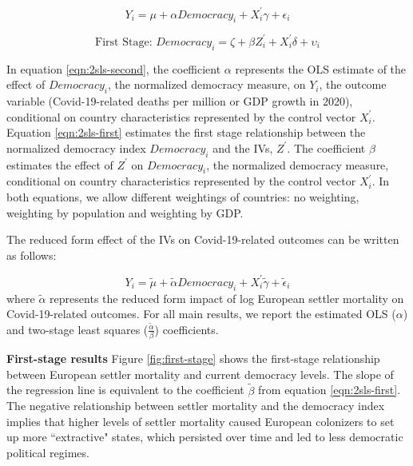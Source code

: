 \begin{equation}
    \label{eqn:2sls-second}
    Y_i = \mu + \alpha Democracy_i + X^{'}_i \gamma + \epsilon_i
\end{equation}

\begin{equation}
    \label{eqn:2sls-first}
    \text{First Stage: } 
    Democracy_i = \zeta + \beta Z^{'}_i + X^{'}_i \delta + \upsilon_i
\end{equation}

\noindent In equation \ref{eqn:2sls-second}, the coefficient $\alpha$ represents the OLS estimate of the effect of $Democracy_i$, the normalized democracy measure, on $Y_i$, the outcome variable (Covid-19-related deaths per million or GDP growth in 2020), conditional on country characteristics represented by the control vector $X^{'}_i$. Equation \ref{eqn:2sls-first} estimates the first stage relationship between the normalized democracy index $Democracy_i$ and the IVs, $Z^{'}$. The coefficient $\beta$ estimates the effect of $Z^{'}$ on $Democracy_i$, the normalized democracy measure, conditional on country characteristics represented by the control vector $X^{'}_i$. In both equations, we allow different weightings of countries: no weighting, weighting by population and weighting by GDP.

The reduced form effect of the IVs on Covid-19-related outcomes can be written as follows:

\begin{equation}
    \label{eqn:reduced}
    Y_i = \tilde{\mu} + \tilde{\alpha}Democracy_i + X^{'}_i\tilde{\gamma} + \tilde{\epsilon}_i
\end{equation}
where $\tilde{\alpha}$ represents the reduced form impact of log European settler mortality on Covid-19-related outcomes. For all main results, we report the estimated OLS ($\alpha$) and two-stage least squares ($\frac{\tilde{\alpha}}{\beta}$) coefficients. 

\noindent \textbf{First-stage results} Figure \ref{fig:first-stage} shows the first-stage relationship between European settler mortality and current democracy levels. The slope of the regression line is equivalent to the coefficient $\tilde{\beta}$ from equation \ref{eqn:2sls-first}. The negative relationship between settler mortality and the democracy index implies that higher levels of settler mortality caused European colonizers to set up more ``extractive" states, which persisted over time and led to less democratic political regimes. 